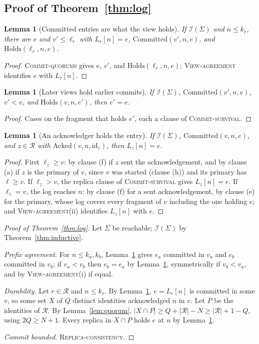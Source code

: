 \documentclass[11pt,a4paper]{article}
\theoremstyle{plain}
\newtheorem{lemma}[theorem]{Lemma}
\theoremstyle{definition}
\theoremstyle{remark}
\newcommand{\Inv}{\mathcal{I}}
\newcommand{\Holds}{\mathrm{Holds}}
\newcommand{\Acked}{\mathrm{Acked}}
\newcommand{\Committed}{\mathrm{Committed}}
\newcommand{\Local}{\textsc{Replica-consistency}}
\newcommand{\OneLog}{\textsc{View-agreement}}
\newcommand{\CommitsBacked}{\textsc{Commit-quorums}}
\newcommand{\Survival}{\textsc{Commit-survival}}
\begin{document}
\subsection{Proof of Theorem~\ref{thm:log}}

\begin{lemma}[Committed entries are what the view holds]
\label{lem:committed}
If $\Inv(\Sigma)$ and $n \le k_r$, there are $e$ and $v' \le \ell_r$ with
$L_r[n] = e$, $\Committed(v', n, e)$, and $\Holds(\ell_r, n, e)$.
\end{lemma}
\begin{proof}
\CommitsBacked{} gives $e$, $v'$, and $\Holds(\ell_r, n, e)$; \OneLog{}
identifies $e$ with $L_r[n]$.
\end{proof}

\begin{lemma}[Later views hold earlier commits]
\label{lem:later}
If $\Inv(\Sigma)$, $\Committed(v', n, e)$, $v' < v$, and
$\Holds(v, n, e')$, then $e' = e$.
\end{lemma}
\begin{proof}
Cases on the fragment that holds $e'$, each a clause of \Survival.
\end{proof}

\begin{lemma}[An acknowledger holds the entry]
\label{lem:acker}
If $\Inv(\Sigma)$, $\Committed(v, n, e)$, and $z \in \mathcal{R}$ with
$\Acked(v, n, \mathrm{id}_z)$, then $L_z[n] = e$.
\end{lemma}
\begin{proof}
First $\ell_z \ge v$: by clause (f) if $z$ sent the acknowledgement, and
by clause (a) if $z$ is the primary of $v$, since $v$ was started
(clause (h)) and its primary has $\ell \ge v$. If $\ell_z > v$, the
replica clause of \Survival{} gives $L_z[n] = e$. If $\ell_z = v$, the
log reaches $n$: by clause (f) for a sent acknowledgement, by clause
(e) for the primary, whose log covers every fragment of $v$ including the
one holding $e$; and \OneLog(ii) identifies $L_z[n]$ with $e$.
\end{proof}

\begin{proof}[Proof of Theorem~\ref{thm:log}]
Let $\Sigma$ be reachable; $\Inv(\Sigma)$ by
Theorem~\ref{thm:inductive}.

\emph{Prefix agreement.} For $n \le k_a, k_b$,
Lemma~\ref{lem:committed} gives $e_a$ committed in $v_a$ and $e_b$
committed in $v_b$; if $v_a < v_b$ then $e_b = e_a$ by
Lemma~\ref{lem:later}, symmetrically if $v_b < v_a$, and by \OneLog(i)
if equal.

\emph{Durability.} Let $r \in \mathcal{R}$ and $n \le k_r$. By
Lemma~\ref{lem:committed}, $e = L_r[n]$ is committed in some $v$, so
some set $X$ of $Q$ distinct identities acknowledged $n$ in $v$. Let $P$
be the identities of $\mathcal{R}$. By Lemma~\ref{lem:quorum},
$|X \cap P| \ge Q + |\mathcal{R}| - N \ge |\mathcal{R}| + 1 - Q$, using
$2Q \ge N + 1$. Every replica in $X \cap P$ holds $e$ at $n$ by
Lemma~\ref{lem:acker}.

\emph{Commit bounded.} \Local.
\end{proof}
\end{document}
